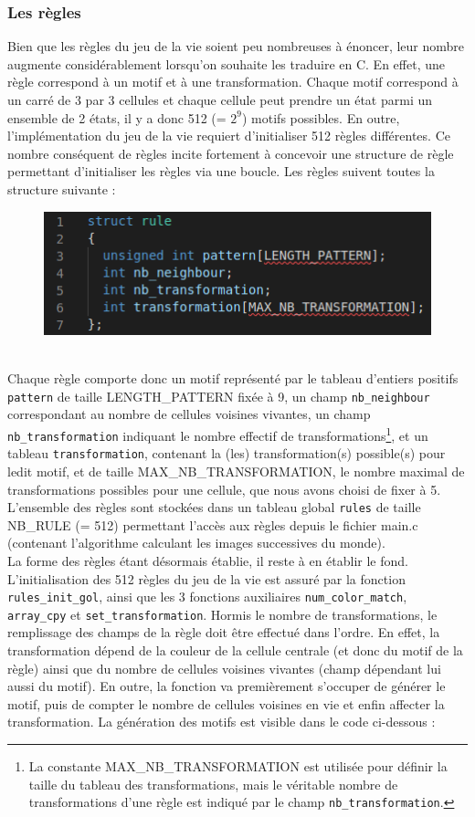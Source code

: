 \documentclass[a4paper]{article}
\begin{document}
\subsubsection{Les règles}
Bien que les règles du jeu de la vie soient peu nombreuses à énoncer, leur nombre augmente considérablement lorsqu'on souhaite les traduire en C. En effet, une règle correspond à un motif et à une transformation. Chaque motif correspond à un carré de 3 par 3 cellules et chaque cellule peut prendre un état parmi un ensemble de 2 états, il y a donc 512 (= \(2^9\)) motifs possibles. En outre, l'implémentation du jeu de la vie requiert d'initialiser 512 règles différentes. Ce nombre conséquent de règles incite fortement à concevoir une structure de règle permettant d'initialiser les règles via une boucle. Les règles suivent toutes la structure suivante :
\begin{figure}[h]
    \centering
    \includegraphics[scale=0.8]{img/rules1.png}
\end{figure}
\\\indent Chaque règle comporte donc un motif représenté par le tableau d'entiers positifs \texttt{pattern} de taille {\small LENGTH\_PATTERN} fixée à 9, un champ \texttt{nb\_neighbour} correspondant au nombre de cellules voisines vivantes, un champ \texttt{nb\_transformation} indiquant le nombre effectif de transformations\footnote{La constante {\small MAX\_NB\_TRANSFORMATION} est utilisée pour définir la taille du tableau des transformations, mais le véritable nombre de transformations d'une règle est indiqué par le champ \texttt{nb\_transformation}.}, et un tableau \texttt{transformation}, contenant la (les) transformation(s) possible(s) pour ledit motif, et de taille {\small MAX\_NB\_TRANSFORMATION}, le nombre maximal de transformations possibles pour une cellule, que nous avons choisi de fixer à 5. L'ensemble des règles sont stockées dans un tableau global \texttt{rules} de taille {\small NB\_RULE} (= 512) permettant l'accès aux règles depuis le fichier main.c (contenant l'algorithme calculant les images successives du monde).\\
\indent La forme des règles étant désormais établie, il reste à en établir le fond. L'initialisation des 512 règles du jeu de la vie est assuré par la fonction \texttt{rules\_init\_gol}, ainsi que les 3 fonctions auxiliaires \texttt{num\_color\_match}, \texttt{array\_cpy} et \texttt{set\_transformation}. Hormis le nombre de transformations, le remplissage des champs de la règle doit être effectué dans l'ordre. En effet, la transformation dépend de la couleur de la cellule centrale (et donc du motif de la règle) ainsi que du nombre de cellules voisines vivantes (champ dépendant lui aussi du motif). En outre, la fonction va premièrement s'occuper de générer le motif, puis de compter le nombre de cellules voisines en vie et enfin affecter la transformation. La génération des motifs est visible dans le code ci-dessous :
\end{document}
